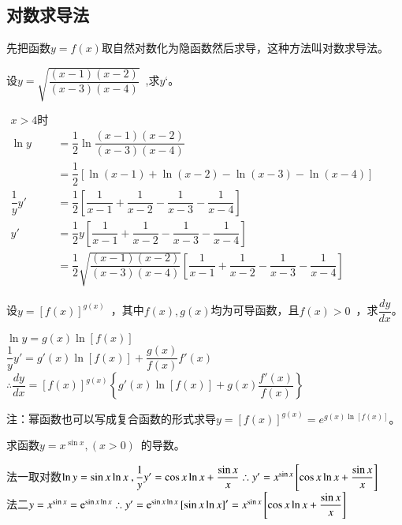 \subsection{对数求导法}
先把函数$y=f(x)$取自然对数化为隐函数然后求导，这种方法叫对数求导法。
\begin{example}
设$y=\sqrt{\dfrac{(x-1)(x-2)}{(x-3)(x-4)}}$~,求$y‘$。
\end{example}
\begin{solution}
$\begin{aligned}
x>4\text{时}\\
\ln y&=\dfrac{1}{2}\ln \dfrac{(x-1)(x-2)}{(x-3)(x-4)}\\
&=\dfrac{1}{2}\left[\ln \left(x-1\right)+\ln \left(x-2\right)-\ln \left(x-3\right)-\ln \left(x-4\right)\right]\\
\dfrac{1}{y}y'&=\dfrac{1}{2}\left[\dfrac{1}{x-1}+\dfrac{1}{x-2}-\dfrac{1}{x-3}-\dfrac{1}{x-4}\right]\\
y'&=\dfrac{1}{2}y\left[\dfrac{1}{x-1}+\dfrac{1}{x-2}-\dfrac{1}{x-3}-\dfrac{1}{x-4}\right]\\
&=\dfrac{1}{2}\sqrt{\dfrac{(x-1)(x-2)}{(x-3)(x-4)}}\left[\dfrac{1}{x-1}+\dfrac{1}{x-2}-\dfrac{1}{x-3}-\dfrac{1}{x-4}\right]
\end{aligned}$
\end{solution}
\begin{example}
设$y=\left[f(x)\right]^{g(x)}$~，其中$f(x),g(x)$均为可导函数，且$f(x)>0$~，求$\dfrac{dy}{dx}$。
\end{example}
\begin{solution}
$\ln y=g(x)\ln \left[f(x)\right]$\\
$\dfrac{1}{y}y'=g'(x)\ln \left[f(x)\right]+\dfrac{g(x)}{f(x)}f'(x)$\\
$\therefore \dfrac{dy}{dx}=\left[f(x)\right]^{g(x)}\left\{g'(x)\ln \left[f(x)\right]+g(x)\dfrac{f'(x)}{f(x)}\right\}$
\end{solution}
{\kaishu\color{blue} 注：幂函数也可以写成复合函数的形式求导$y=\left[f(x)\right]^{g(x)}=e^{g(x)\ln \left[f(x)\right]}$。}
\begin{example}
求函数$y=x^{\sin x},(x>0)$~的导数。
\end{example}
\begin{solution}
法一\quad 取对数$\ln y=\sin x\ln x~,\dfrac{1}{y}y'=\cos x\ln x+\dfrac{\sin x}{x}\\
\therefore y'=x^{\sin x}\left[\cos x\ln x+\dfrac{\sin x}{x}\right]$\\
法二\quad$y=x^{\sin x}=\mathrm{e}^{\sin x\ln x}\\
\therefore y'=\mathrm{e}^{\sin x\ln x}\left[\sin x\ln x\right]'=x^{\sin x}\left[\cos x\ln x+\dfrac{\sin x}{x}\right]$
\end{solution}
